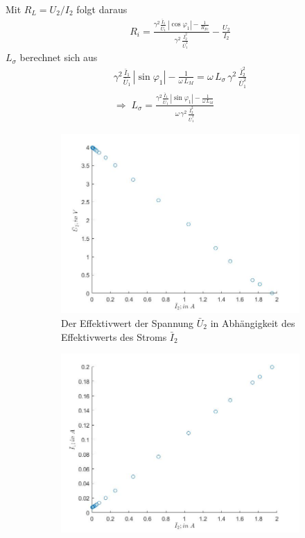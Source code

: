 \documentclass[a4paper, 12pt,]{scrartcl}
\begin{document}
Mit $R_L=U_2/I_2$ folgt daraus
\begin{align*}
R_i=\frac{\gamma^2\frac{\bar{I}_1}{\bar{U}_1}\,|\cos\varphi_1|-\frac{1}{R_{Fe}}}{\gamma^2\,\frac{\bar{I}_2^2}{\bar{U}_1^2}}-\frac{U_2}{I_2}
\end{align*}
$L_\sigma$ berechnet sich aus
\begin{gather*}
\gamma^2\frac{\bar{I}_1}{\bar{U}_1}\,|\sin\varphi_1|-\frac{1}{\omega\,L_M}=\omega\,L_\sigma\,\gamma^2\,\frac{\bar{I}_2^2}{\bar{U}_1^2}\\
\Rightarrow\;L_\sigma=\frac{\gamma^2\frac{\bar{I}_1}{\bar{U}_1}\,|\sin\varphi_1|-\frac{1}{\omega\,L_M}}{\omega\,\gamma^2\,\frac{\bar{I}_2^2}{\bar{U}_1^2}}\end{gather*}

\begin{figure}[H]\centering
\begin{adjustwidth}{-1em}{7em}
  \begin{subfigure}[b]{0.5\textwidth}
    \includegraphics[width=\textwidth]{I2U22}
    \caption{Der Effektivwert der Spannung $\bar{U}_2$ in Abhängigkeit des Effektivwerts des Stroms $\bar{I}_2$}
    \label{fig:}
  \end{subfigure}
  \begin{subfigure}[b]{0.5\textwidth}
    \includegraphics[width=\textwidth]{I2I1}

\end{subfigure}
\end{adjustwidth}
\end{figure}
\end{document}
